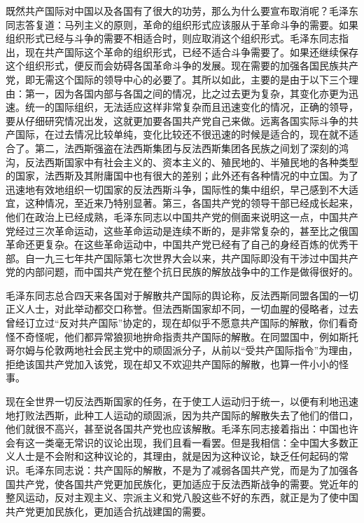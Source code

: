 既然共产国际对中国以及各国有了很大的功劳，那么为什么要宣布取消呢？毛泽东同志答复道：马列主义的原则，革命的组织形式应该服从于革命斗争的需要。如果组织形式已经与斗争的需要不相适合时，则应取消这个组织形式。毛泽东同志指出，现在共产国际这个革命的组织形式，已经不适合斗争需要了。如果还继续保存这个组织形式，便反而会妨碍各国革命斗争的发展。现在需要的加强各国民族共产党，即无需这个国际的领导中心的必要了。其所以如此，主要的是由于以下三个理由：第一，因为各国内部与各国之间的情况，比之过去更为复杂，其变化亦更为迅速。统一的国际组织，无法适应这样非常复杂而且迅速变化的情况，正确的领导，要从仔细研究情况出发，这就更加要各国共产党自己来做。远离各国实际斗争的共产国际，在过去情况比较单纯，变化比较还不很迅速的时候是适合的，现在就不适合了。第二，法西斯强盗在法西斯集团与反法西斯集团各民族之间划了深刻的鸿沟，反法西斯国家中有社会主义的、资本主义的、殖民地的、半殖民地的各种类型的国家，法西斯及其附庸国中也有很大的差别；此外还有各种情况的中立国。为了迅速地有效地组织一切国家的反法西斯斗争，国际性的集中组织，早己感到不大适宜，这种情况，至近来乃特别显著。第三，各国共产党的领导干部已经成长起来，他们在政治上已经成熟，毛泽东同志以中国共产党的侧面来说明这一点，中国共产党经过三次革命运动，这些革命运动是连续不断的，是非常复杂的，甚至比之俄国革命还更复杂。在这些革命运动中，中国共产党已经有了自己的身经百炼的优秀干部。自一九三七年共产国际第七次世界大会以来，共产国际即没有干涉过中国共产党的内部问题，而中国共产党在整个抗日民族的解放战争中的工作是做得很好的。

毛泽东同志总合四天来各国对于解散共产国际的舆论称，反法西斯同盟各国的一切正义人士，对此举动都交口称誉。但法西斯国家却不同，一切血腥的侵略者，过去曾经订立过“反对共产国际”协定的，现在却似乎不愿意共产国际的解散，你们看奇怪不奇怪呢，他们都异常狼狈地拚命指责共产国际的解散。在同盟国中，例如斯托哥尔姆与伦敦两地社会民主党中的顽固派分子，从前以“受共产国际指令”为理由，拒绝该国共产党加入该党，现在却又不欢迎共产国际的解散，也算一件小小的怪事。

现在全世界一切反法西斯国家的任务，在于使工人运动归于统一，以便有利地迅速地打败法西斯，此种工人运动的顽固派，因为共产国际的解散失去了他们的借口，他们就很不高兴，甚至说各国共产党也应该解散。毛泽东同志接着指出：中国也许会有这一类毫无常识的议论出现，我们且看一看罢。但是我相信：全中国大多数正义人士是不会附和这种议论的，其理由，就是因为这种议论，缺乏任何起码的常识。毛泽东同志说：共产国际的解散，不是为了减弱各国共产党，而是为了加强各国共产党，使各国共产党更加民族化，更加适应于反法西斯战争的需要。党近年的整风运动，反对主观主义、宗派主义和党八股这些不好的东西，就正是为了使中国共产党更加民族化，更加适合抗战建国的需要。

